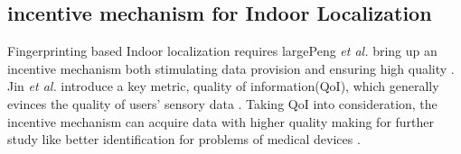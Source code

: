 \documentclass[10pt,conference,compsocconf,letterpaper]{IEEEtran}
\begin{document}
\subsection{incentive mechanism for  Indoor Localization}
Fingerprinting based Indoor localization requires largePeng \emph {et al.} %
bring up an incentive mechanism both stimulating data provision and ensuring high quality \cite{Peng2015Pay}. Jin \emph{et al.} introduce a key metric, quality of information(QoI), which generally evinces the quality of users’ sensory data%
\cite{Jin2015Quality}. Taking QoI into consideration, the incentive mechanism can acquire data with higher quality making for further study like better identification for problems of medical devices \cite{Jin2015Quality}.\\
\end{document}
